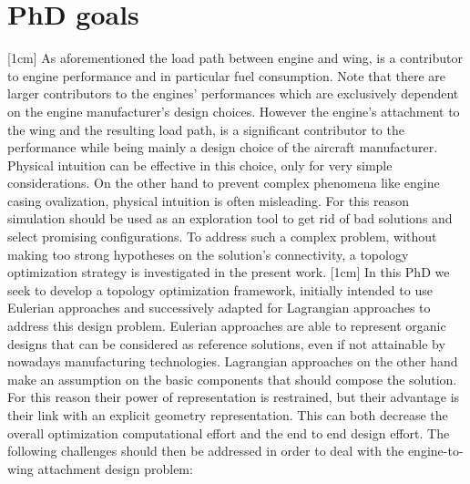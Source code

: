 \section*{PhD goals}
[1cm]
As aforementioned the load path between engine and wing, is a contributor to engine performance and in particular fuel consumption. Note that there are larger contributors to the engines’ performances which are exclusively dependent on the engine manufacturer's design choices. However the engine's attachment to the wing and the resulting load path, is a significant contributor to the performance while being mainly a design choice of the aircraft manufacturer.
Physical intuition can be effective in this choice, only for very simple considerations. On the other hand to prevent complex phenomena like engine casing ovalization, physical intuition is often misleading. For this reason simulation should be used as an exploration tool to get rid of bad solutions and select promising configurations. To address such a complex problem, without making too strong hypotheses on the solution's connectivity, a topology optimization strategy is investigated in the present work. 
[1cm]
In this PhD we seek to develop a topology optimization framework, initially intended to use Eulerian approaches and successively adapted for Lagrangian approaches to address this design problem. Eulerian approaches are able to represent organic designs that can be considered as reference solutions, even if not attainable by nowadays manufacturing technologies. Lagrangian approaches on the other hand make an assumption on the basic components that should compose the solution. For this reason their power of representation is restrained, but their advantage is their link with an explicit geometry representation. This can both decrease the overall optimization computational effort and the end to end design effort.
The following challenges should then be addressed in order to deal with the engine-to-wing attachment design problem:
